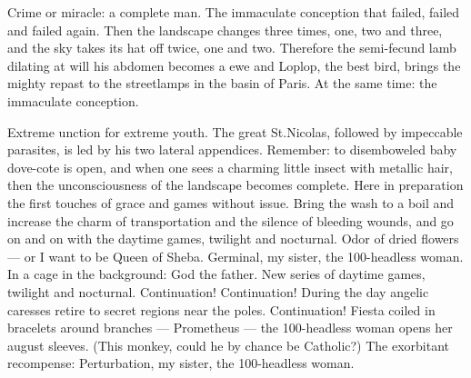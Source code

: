\documentclass{essay}
\begin{document}
\sffamily







\begin{essaystyle}

Crime or miracle: a complete man. The immaculate conception that failed, failed
and failed again. Then the landscape changes three times, one, two and three,
and the sky takes its hat off twice, one and two. Therefore the semi-fecund
lamb dilating at will his abdomen becomes a ewe and Loplop, the best bird,
brings the mighty repast to the streetlamps in the basin of Paris. At the same
time: the immaculate conception.

Extreme unction for extreme youth. The great St.\@ Nicolas, followed by
impeccable parasites, is led by his two lateral appendices. Remember: to
disemboweled baby dove-cote is open, and when one sees a charming little insect
with metallic hair, then the unconsciousness of the landscape becomes complete.
Here in preparation the first touches of grace and games without issue. Bring
the wash to a boil and increase the charm of transportation and the silence of
bleeding wounds, and go on and on with the daytime games, twilight and
nocturnal. Odor of dried flowers --- or I want to be Queen of Sheba. Germinal,
my sister, the 100-headless woman. In a cage in the background: God the father.
New series of daytime games, twilight and nocturnal. Continuation!
Continuation! During the day angelic caresses retire to secret regions near the
poles. Continuation! Fiesta coiled in bracelets around branches --- Prometheus
--- the 100-headless woman opens her august sleeves. (This monkey, could he by
chance be Catholic?) The exorbitant recompense: Perturbation, my sister, the
100-headless woman.


\end{essaystyle}
\end{document}
